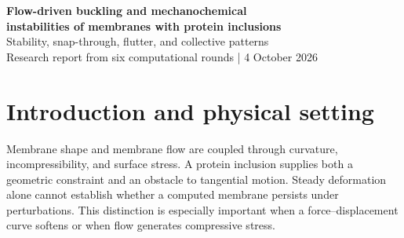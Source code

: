 

\thispagestyle{plain}
\begin{center}
{\LARGE\bfseries\textcolor{ink}{Flow-driven buckling and mechanochemical\\[3pt] instabilities of membranes with protein inclusions}}\\[9pt]
{\large Stability, snap-through, flutter, and collective patterns}\\[6pt]
{\small Research report from six computational rounds | 4 October 2026}
\end{center}
\begin{abstract}
A membrane flowing past an anchored protein can lose stability because obstacle drag creates an upstream region of compressive stress. We construct a finite-element stability analysis directly from IRENE's residual equations and validate it against analytical spectra, cylinder-wake instability, an independent plate reduction, nonlinear time integration, and mesh refinement. Physical vertical force balance at the protein raises the reference buckling threshold from $\SL\simeq16$ to $27.45$. Continuation and a computed weakly nonlinear reduction show that the transition is subcritical: a small imposed contact slope advances a fold according to Koiter's $2/3$ law, after which the membrane collapses into an upstream pit and develops an overhang beneath the lifted protein. In-plane friction instead supports a saturated fluttering wave source in a window of screening lengths. Static ring pulling distinguishes stable height control from a force-controlled tether-nucleation barrier. Extensions to mobile curvature-coupled proteins and periodic arrays reveal transport-dependent mechanochemical instabilities and drifting terrace patterns. The report separates quantitatively verified thresholds from model-dependent extrapolations and unresolved large-deformation dynamics.
\end{abstract}

\section{Introduction and physical setting}
Membrane shape and membrane flow are coupled through curvature, incompressibility, and surface stress. A protein inclusion supplies both a geometric constraint and an obstacle to tangential motion. Steady deformation alone cannot establish whether a computed membrane persists under perturbations. This distinction is especially important when a force--displacement curve softens or when flow generates compressive stress.

